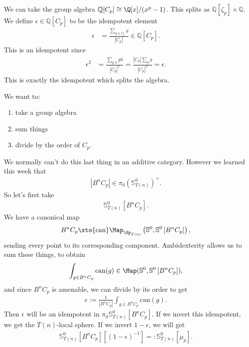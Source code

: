 We can take the group algebra $\mathbb{Q}[C_p] \cong \Q[x]/(x^p-1)$. This splits as $\mathbb{Q}[\zeta_p] \times \mathbb{Q}$. We define $\epsilon \in \mathbb{Q}[C_p]$ to be the idempotent element
\begin{align*}
    \epsilon &= \frac{\sum_{y\in C_p} y}{|C_p|} \in \mathbb{Q}[C_p].
\end{align*}
This is an idempotent since
\begin{align*}
    \epsilon^2 &= \frac{\sum_{g,h} gh}{|C_p|^2} = \frac{|C_p| \sum_g g}{|C_p|^2} = \epsilon.
\end{align*}
This is exactly the idempotent which splits the algebra.

We want to:
\begin{enumerate}
    \item take a group algebra
    \item sum things
    \item divide by the order of $C_p$.
\end{enumerate}
We normally can't do this last thing in an additive category. However we learned this week that
\begin{align*}
    \left| B^n C_p \right| \in \pi_0 \left( \mathbb{S}_{T(n)}^0 \right)^\times.
\end{align*}
So let's first take
\begin{align*}
    \mathbb{S}_{T(n)}^0 \left[ B^n C_p \right].
\end{align*}
We have a canonical map
\begin{align*}
    B^n C_p \xto{\text{can}} \Map_{\Sp_{T(n)}} \left( \mathbb{S}^0, \mathbb{S}^0 \left[ B^n C_p \right] \right),
\end{align*}
sending every point to its corresponding component. Ambidexterity allows us to sum these things, to obtain
\begin{align*}
    \int_{g\in B^n C_p} \text{can}(g) \in \Map(\mathbb{S}^0, \mathbb{S}^0 \left[ B^n C_p \right]),
\end{align*}
and since $B^nC_p$ is amenable, we can divide by its order to get
\begin{align*}
    \epsilon:= \frac{1}{|B^n C_p|} \int_{g\in B^n C_p} \text{can}(g).
\end{align*}
Then $\epsilon$ will be an idempotent in $\pi_0 \mathbb{S}^0_{T(n)} \left[ B^n C_p \right]$. If we invert this idempotent, we get the $T(n)$-local sphere. If we invert $1-\epsilon$, we will get
\begin{align*}
    \mathbb{S}^0_{T(n)} \left[ B^n C_p \right] \left[ (1-\epsilon)^{-1} \right] =: \mathbb{S}_{T(n)}^0 \left[ \mu_p \right].
\end{align*}

